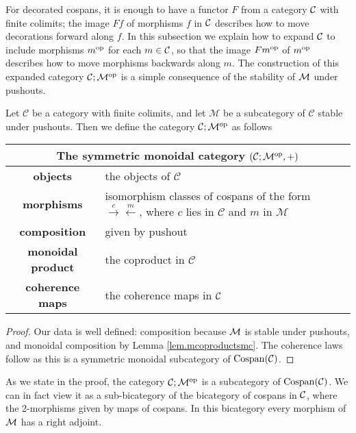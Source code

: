 For decorated cospans, it is enough to have a functor $F$ from a category $\mathcal
C$ with finite colimits; the image $Ff$ of morphisms $f$ in $\mathcal C$ describes
how to move decorations forward along $f$. In this subsection we explain how to
expand $\mathcal C$ to include morphisms $m^{\mathrm{op}}$ for each $m \in \mathcal C$, so that the
image $Fm^{\mathrm{op}}$ of $m^{\mathrm{op}}$ describes how to move morphisms backwards along $m$.
The construction of this expanded category $\mathcal C;\mathcal M^{\mathrm{op}}$ is a simple
consequence of the stability of $\mathcal M$ under pushouts.

\begin{proposition}
  Let $\mathcal C$ be a category with finite colimits, and let $\mathcal M$ be a
  subcategory of $\mathcal C$ stable under pushouts. Then we define the category
  $\mathcal C; \mathcal M^{\mathrm{op}}$ as follows  
  \smallskip 

  \begin{center}
    \begin{tabular}{| c | p{} |}
      \hline
      \multicolumn{2}{|c|}{The symmetric monoidal category $(\mathcal C;\mathcal M^{\mathrm{op}},+)$} \\
      \hline
      \textbf{objects} & the objects of $\mathcal C$ \\ 
      \textbf{morphisms} & isomorphism classes of cospans of the form
      $\stackrel{c}\rightarrow \stackrel{m}\leftarrow$, where $c$ lies in
      $\mathcal C$ and $m$ in $\mathcal M$\\ 
      \textbf{composition} & given by pushout \\
      \textbf{monoidal product} & the coproduct in $\mathcal C$ \\
      \textbf{coherence maps} & the coherence maps in $\mathcal C$ \\
      \hline
    \end{tabular}
  \end{center}
  \smallskip 
\end{proposition}

\begin{proof}
  Our data is well defined: composition because $\mathcal M$ is stable under
  pushouts, and monoidal composition by Lemma \ref{lem.mcoproductsmc}. The
  coherence laws follow as this is a symmetric monoidal subcategory of
  $\operatorname{{Cospan}}(\mathcal C)$. 
\end{proof}

\begin{remark}
As we state in the proof, the category $\mathcal C;\mathcal M^{\mathrm{op}}$ is a subcategory of
$\operatorname{{Cospan}}(\mathcal C)$. We can in fact view it as a sub-bicategory of the bicategory
of cospans in $\mathcal C$, where the 2-morphisms given by maps of cospans. In this
bicategory every morphism of $\mathcal M$ has a right adjoint.
\end{remark}


